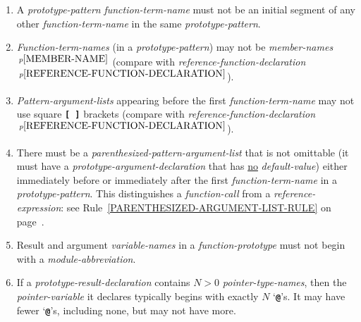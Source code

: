 \documentclass[12pt]{article}
\newcommand{\TT}[1]{{\tt \bfseries #1}}
\newcommand{\pagnote}[1]{$\,^{p\pageref{#1}}$}
\newcommand{\EOL}{\penalty \exhyphenpenalty}
\begin{document}
\begin{enumerate}\label{FUNCTION-DECLARATION-RULES}
\item
A {\em prototype-pattern} {\em function-term-name} must not be
an initial segment of any other {\em function-term-name}
in the same {\em prototype-pattern}.
\item
{\em Function-term-names} (in a {\em prototype-pattern})
may not be {\em member-names}\pagnote{MEMBER-NAME}
(compare with {\em reference-function-declaration}%
\pagnote{REFERENCE-FUNCTION-DECLARATION}).
\item
{\em Pattern-argument-lists} appearing before the first
{\em function-term-name} may not use square \TT{[~]} brackets
(compare with {\em reference-function-declaration}%
\pagnote{REFERENCE-FUNCTION-DECLARATION}).
\item
There must be a {\em parenthesized-pattern-argument-list} that
is not omittable (it must have a {\em prototype-argument-declaration}
that has \underline{no} {\em default-value}) either immediately
before or immediately after the first {\em function-term-name}
in a {\em prototype-pattern}.  This distinguishes a
{\em function-call} from a {\em reference-expression}:
see Rule~\ref{PARENTHESIZED-ARGUMENT-LIST-RULE} on
page~\pageref{PARENTHESIZED-ARGUMENT-LIST-RULE}.
\item
Result and argument {\em variable-names}
in a {\em function-prototype} must not begin with a {\em module-abbreviation}.
\item If a {\em prototype-result-declaration}
contains $N>0$ {\em pointer-type-names}, then the {\em pointer-\EOL variable}
it declares typically begins with exactly $N$ `\TT{@}'s.
It may have fewer `\TT{@}'s, including none, but may not have more.


\end{enumerate}
\end{document}
